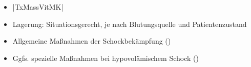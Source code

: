 %
\label{m:blutung-verdauungstrakt}%
\begin{itemize}
  \item |TxMassVitMK|
    \item Lagerung:
    Situationsgerecht, je nach Blutungsquelle und
    Patientenzustand
  \item Allgemeine Maßnahmen der Schockbekämpfung
  ()
  \item Ggfs. spezielle Maßnahmen bei hypovolämischem Schock
  ()
\end{itemize}